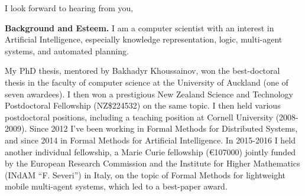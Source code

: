\documentclass[10,a4paper,sans]{moderncv}
\begin{document}
\date{November, 2017}
\opening{\vspace{-13mm}}
\closing{I look forward to hearing from you, \vspace{-1cm}}

\makelettertitle

% 
% 




\textbf{Background and Esteem.}
I am a computer scientist with an interest in Artificial Intelligence, especially knowledge representation, logic, multi-agent systems, and automated planning. 

My PhD thesis, mentored by Bakhadyr Khoussainov, won the best-doctoral thesis in the faculty of computer science at the University of Auckland (one of seven awardees).
I then won a prestigious New Zealand Science and Technology Postdoctoral Fellowship (NZ\$224532) on the same topic. I then held various postdoctoral positions, including a teaching position at Cornell University (2008-2009). Since 2012 I've been working in Formal Methods for Distributed Systems, and since 2014 in Formal Methods for Artificial Intelligence. 
In 2015-2016 I held another individual fellowship, a Marie Curie fellowship (\euro{107000}) jointly funded by the European Research Commission and the Institute for Higher Mathematics (INdAM ``F. Severi'') in Italy, on the topic of Formal Methods for lightweight mobile multi-agent systems, which led to a best-paper award. 
\end{document}
